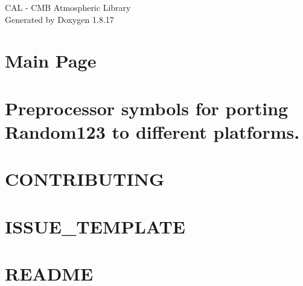 \let\mypdfximage\pdfximage\def\pdfximage{\immediate\mypdfximage}\documentclass[twoside]{book}
\newcommand{\+}{\discretionary{\mbox{\scriptsize$\hookleftarrow$}}{}{}}
\newcommand{\clearemptydoublepage}{%
  \newpage{\pagestyle{empty}\cleardoublepage}%
}
\begin{document}
\hypersetup{pageanchor=false,
             bookmarksnumbered=true,
             pdfencoding=unicode
            }
\begin{titlepage}
\vspace*{7cm}
\begin{center}%
{\Large C\+AL -\/ C\+MB Atmospheric Library }\\
\vspace*{1cm}
{\large Generated by Doxygen 1.8.17}\\
\end{center}
\end{titlepage}
\clearemptydoublepage
{}
\tableofcontents
\clearemptydoublepage
{}
\hypersetup{pageanchor=true}

\chapter{Main Page}
\label{index}\hypertarget{index}{}
\chapter{Preprocessor symbols for porting Random123 to different platforms.}
\label{porting}

\chapter{C\+O\+N\+T\+R\+I\+B\+U\+T\+I\+NG}
\label{md__home_algebrato__progetti__c_m_b4_g_libcal_src_pycal_pybind11__c_o_n_t_r_i_b_u_t_i_n_g}

\chapter{I\+S\+S\+U\+E\+\_\+\+T\+E\+M\+P\+L\+A\+TE}
\label{md__home_algebrato__progetti__c_m_b4_g_libcal_src_pycal_pybind11__i_s_s_u_e__t_e_m_p_l_a_t_e}

\chapter{R\+E\+A\+D\+ME}
\label{md__home_algebrato__progetti__c_m_b4_g_libcal_src_pycal_pybind11__r_e_a_d_m_e}

\end{document}
